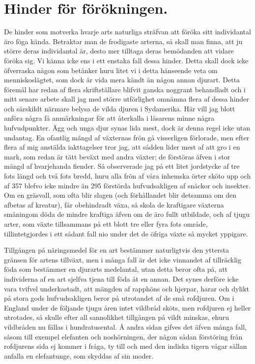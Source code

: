 \section{Hinder för förökningen.}

De hinder som motverka hvarje arts naturliga sträfvan att föröka sitt individantal äro föga kända. Betraktar man de frodigaste arterna, så skall man finna, att ju större deras individantal är, desto mer tilltaga deras bemödanden att vidare föröka sig. Vi känna icke ens i ett enstaka fall dessa hinder. Detta skall dock icke öfverraska någon som betänker huru litet vi i detta hänseende veta om menniskoslägtet, som dock är vida mera kändt än någon annan djurart. Detta föremål har redan af flera skriftställare blifvit ganska noggrant behandladt och i mitt senare arbete skall jag med större utförlighet omnämna flera af dessa hinder och särskildt närmare belysa de vilda djuren i Sydamerika. Här vill jag blott anföra några få anmärkningar för att återkalla i läsarens minne några hufvudpunkter. Ägg och unga djur synas lida mest, dock är denna regel icke utan undantag. En ofantlig mängd af växternas frön gå visserligen förlorade, men efter flera af mig anstälda iakttagelser tror jag, att sådden lider mest af att gro i en mark, som redan är tätt beväxt med andra växter; de förstöras äfven i stor mängd af hvarjehanda fiender. Så observerade jag på ett litet jordstycke af tre fots längd och två fots bredd, huru alla frön af våra inhemska örter sköto upp och af 357 blefvo icke mindre än 295 förstörda hufvudsakligen af snäckor och insekter. Om en gräsvall, som ofta blir slagen (och förhållandet blir detsamma om den afbetas af kreatur), får obehindradt växa, så skola de kraftigare växterna småningom döda de mindre kraftiga äfven om de äro fullt utbildade, och af tjugu arter, som växte tillsammans på ett blott tre eller fyra fots område, tillintetgjordes i ett sådant fall nio under det de öfriga växte så mycket yppigare.

Tillgången på näringsmedel för en art bestämmer naturligtvis den yttersta gränsen för artens tillväxt, men i många fall är det icke vinnandet af tillräcklig föda som bestämmer en djurarts medelantal, utan detta beror ofta på, att individerna af en art sjelfva tjena till föda åt en annan. Det synes derföre icke vara tvifvel underkastadt, att mängden af rapphöns och hjerpar, harar och dylikt på stora gods hufvudsakligen beror på utrotandet af de små rofdjuren. Om i England under de följande tjugu åren intet vildbråd sköts, men rofdjuren ej heller utrotades, så skulle efter all sannolikhet tillgången på vildt minskas, ehuru vildbråden nu fällas i hundratusental. Å andra sidan gifves det äfven många fall, såsom till exempel elefanten och noshörningen, der någon sådan förstöring från rofdjurens sida ej kommer i fråga, ty till och med den indiska tigern vågar sällan anfalla en elefantunge, som skyddas af sin moder.

